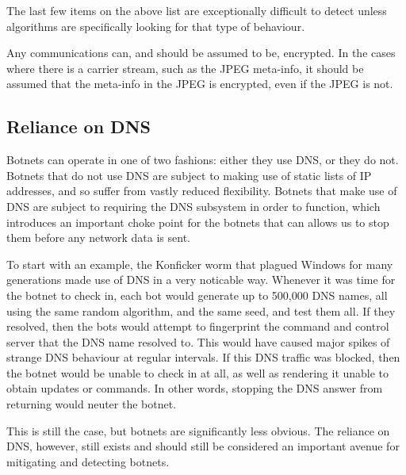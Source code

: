 \documentclass{article}
\theoremstyle{remark}
\theoremstyle{definition}
\theoremstyle{definition}
\theoremstyle{definition}
\begin{document}
The last few items on the above list are exceptionally difficult to detect unless algorithms are specifically looking for that type of behaviour.

Any communications can, and should be assumed to be, encrypted. In the cases where there is a carrier stream, such as the JPEG meta-info, it should be assumed that the meta-info in the JPEG is encrypted, even if the JPEG is not.

\subsection{Reliance on DNS}
Botnets can operate in one of two fashions: either they use DNS, or they do not. Botnets that do not use DNS are subject to making use of static lists of IP addresses, and so suffer from vastly reduced flexibility. Botnets that make use of DNS are subject to requiring the DNS subsystem in order to function, which introduces an important choke point for the botnets that can allows us to stop them before any network data is sent.

To start with an example, the Konficker worm that plagued Windows for many generations made use of DNS in a very noticable way. Whenever it was time for the botnet to check in, each bot would generate up to 500,000 DNS names, all using the same random algorithm, and the same seed, and test them all. If they resolved, then the bots would attempt to fingerprint the command and control server that the DNS name resolved to. This would have caused major spikes of strange DNS behaviour at regular intervals. If this DNS traffic was blocked, then the botnet would be unable to check in at all, as well as rendering it unable to obtain updates or commands. In other words, stopping the DNS answer from returning would neuter the botnet.

This is still the case, but botnets are significantly less obvious. The reliance on DNS, however, still exists and should still be considered an important avenue for mitigating and detecting botnets.
\end{document}
